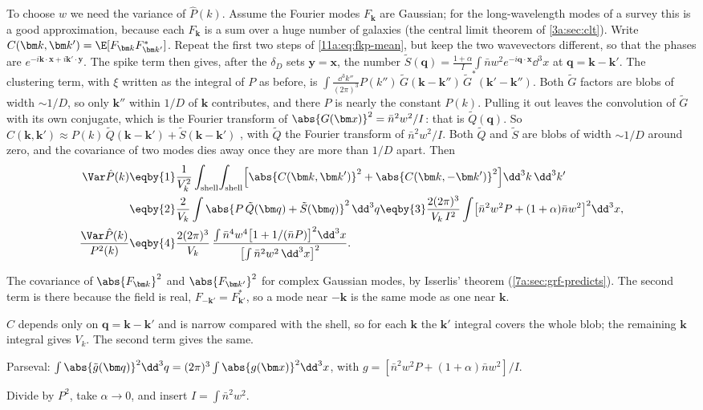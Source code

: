 To choose $w$ we need the variance of $\hat P(k)$. Assume the Fourier modes $F_{\bm
k}$ are Gaussian; for the long-wavelength modes of a survey this is a good
approximation, because each $F_{\bm k}$ is a sum over a huge number of
galaxies (the central limit theorem of \cref{3a:sec:clt}). Write
$C(\bm k,\bm k')=\E[F_{\bm k}F^*_{\bm k'}]$. Repeat the first two steps of
\eqref{11a:eq:fkp-mean}, but keep the two wavevectors different, so that the
phases are $e^{-i\bm k\cdot\bm x+i\bm k'\cdot\bm y}$. The spike term then gives,
after the $\delta_D$ sets $\bm y=\bm x$, the number
$\tilde S(\bm q)=\frac{1+\alpha}{I}\int\bar nw^2e^{-i\bm q\cdot\bm x}\dd^3x$ at
$\bm q=\bm k-\bm k'$. The clustering term, with $\xi$ written as the integral of
$P$ as before, is $\int\frac{\dd^3k''}{(2\pi)^3}P(k'')\,\tilde G(\bm k-\bm k'')\,
\tilde G^*(\bm k'-\bm k'')$. Both $\tilde G$ factors are blobs of width $\sim1/D$,
so only $\bm k''$ within $1/D$ of $\bm k$ contributes, and there $P$ is nearly
the constant $P(k)$. Pulling it out leaves the convolution of $\tilde G$ with its
own conjugate, which is the Fourier transform of $\abs{G(\bm x)}^2=\bar n^2w^2/I$:
that is $\tilde Q(\bm q)$. So
$C(\bm k,\bm k')\approx P(k)\,\tilde Q(\bm k-\bm k')+\tilde S(\bm k-\bm k')$
, with $\tilde Q$ the Fourier transform of
$\bar n^2w^2/I$. Both $\tilde Q$ and $\tilde S$ are blobs of width $\sim1/D$ around
zero, and the covariance of two modes dies away once they are more than $1/D$
apart. Then
\begin{align}
  \Var\hat P(k)
  &\eqby{1}\frac{1}{V_k^2}\int_{\text{shell}}\!\int_{\text{shell}}
     \Bigl[\abs{C(\bm k,\bm k')}^2+\abs{C(\bm k,-\bm k')}^2\Bigr]
     \dd^3k\,\dd^3k'\nonumber\\
  &\eqby{2}\frac{2}{V_k}\int\abs{P\,\tilde Q(\bm q)+\tilde S(\bm q)}^2\,\dd^3q
   \eqby{3}\frac{2(2\pi)^3}{V_k\,I^2}\int\bigl[\bar n^2w^2P+(1+\alpha)\bar nw^2\bigr]^2\dd^3x,
  \nonumber\\
  \frac{\Var\hat P(k)}{P^2(k)}
  &\eqby{4}\frac{2(2\pi)^3}{V_k}\,
   \frac{\int\bar n^4w^4\bigl[1+1/(\bar nP)\bigr]^2\dd^3x}
        {\bigl[\int\bar n^2w^2\,\dd^3x\bigr]^2}.
  \label{11a:eq:fkp-var}
\end{align}
\begin{explain}
  \item The covariance of $\abs{F_{\bm k}}^2$ and $\abs{F_{\bm k'}}^2$ for complex
        Gaussian modes, by Isserlis' theorem (\cref{7a:sec:grf-predicts}). The
        second term is there because the field is real, $F_{-\bm k'}=F^*_{\bm k'}$,
        so a mode near $-\bm k$ is the same mode as one near $\bm k$.
  \item $C$ depends only on $\bm q=\bm k-\bm k'$ and is narrow compared with the
        shell, so for each $\bm k$ the $\bm k'$ integral covers the whole blob; the
        remaining $\bm k$ integral gives $V_k$. The second term gives the same.
  \item Parseval: $\int\abs{\tilde g(\bm q)}^2\dd^3q=(2\pi)^3\int\abs{g(\bm x)}^2\dd^3x$,
        with $g=[\bar n^2w^2P+(1+\alpha)\bar nw^2]/I$.
  \item Divide by $P^2$, take $\alpha\to0$, and insert $I=\int\bar n^2w^2$.
\end{explain}
